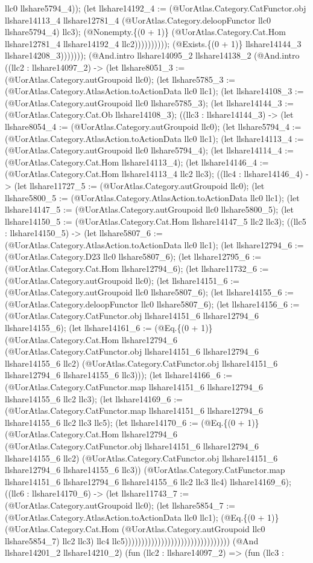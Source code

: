\documentclass[11pt]{article}
\begin{document}
llc0 llshare5794\_4)); (let llshare14192\_4 := (@UorAtlas.Category.CatFunctor.obj llshare14113\_4 llshare12781\_4 (@UorAtlas.Category.deloopFunctor llc0 llshare5794\_4) llc3); (@Nonempty.\{(0 + 1)\} (@UorAtlas.Category.Cat.Hom llshare12781\_4 llshare14192\_4 llc2)))))))))); (@Exists.\{(0 + 1)\} llshare14144\_3 llshare14208\_3))))))); (@And.intro llshare14095\_2 llshare14138\_2 (@And.intro ((llc2 : llshare14097\_2) -> (let llshare8051\_3 := (@UorAtlas.Category.autGroupoid llc0); (let llshare5785\_3 := (@UorAtlas.Category.AtlasAction.toActionData llc0 llc1); (let llshare14108\_3 := (@UorAtlas.Category.autGroupoid llc0 llshare5785\_3); (let llshare14144\_3 := (@UorAtlas.Category.Cat.Ob llshare14108\_3); ((llc3 : llshare14144\_3) -> (let llshare8054\_4 := (@UorAtlas.Category.autGroupoid llc0); (let llshare5794\_4 := (@UorAtlas.Category.AtlasAction.toActionData llc0 llc1); (let llshare14113\_4 := (@UorAtlas.Category.autGroupoid llc0 llshare5794\_4); (let llshare14114\_4 := (@UorAtlas.Category.Cat.Hom llshare14113\_4); (let llshare14146\_4 := (@UorAtlas.Category.Cat.Hom llshare14113\_4 llc2 llc3); ((llc4 : llshare14146\_4) -> (let llshare11727\_5 := (@UorAtlas.Category.autGroupoid llc0); (let llshare5800\_5 := (@UorAtlas.Category.AtlasAction.toActionData llc0 llc1); (let llshare14147\_5 := (@UorAtlas.Category.autGroupoid llc0 llshare5800\_5); (let llshare14150\_5 := (@UorAtlas.Category.Cat.Hom llshare14147\_5 llc2 llc3); ((llc5 : llshare14150\_5) -> (let llshare5807\_6 := (@UorAtlas.Category.AtlasAction.toActionData llc0 llc1); (let llshare12794\_6 := (@UorAtlas.Category.D23 llc0 llshare5807\_6); (let llshare12795\_6 := (@UorAtlas.Category.Cat.Hom llshare12794\_6); (let llshare11732\_6 := (@UorAtlas.Category.autGroupoid llc0); (let llshare14151\_6 := (@UorAtlas.Category.autGroupoid llc0 llshare5807\_6); (let llshare14155\_6 := (@UorAtlas.Category.deloopFunctor llc0 llshare5807\_6); (let llshare14156\_6 := (@UorAtlas.Category.CatFunctor.obj llshare14151\_6 llshare12794\_6 llshare14155\_6); (let llshare14161\_6 := (@Eq.\{(0 + 1)\} (@UorAtlas.Category.Cat.Hom llshare12794\_6 (@UorAtlas.Category.CatFunctor.obj llshare14151\_6 llshare12794\_6 llshare14155\_6 llc2) (@UorAtlas.Category.CatFunctor.obj llshare14151\_6 llshare12794\_6 llshare14155\_6 llc3))); (let llshare14166\_6 := (@UorAtlas.Category.CatFunctor.map llshare14151\_6 llshare12794\_6 llshare14155\_6 llc2 llc3); (let llshare14169\_6 := (@UorAtlas.Category.CatFunctor.map llshare14151\_6 llshare12794\_6 llshare14155\_6 llc2 llc3 llc5); (let llshare14170\_6 := (@Eq.\{(0 + 1)\} (@UorAtlas.Category.Cat.Hom llshare12794\_6 (@UorAtlas.Category.CatFunctor.obj llshare14151\_6 llshare12794\_6 llshare14155\_6 llc2) (@UorAtlas.Category.CatFunctor.obj llshare14151\_6 llshare12794\_6 llshare14155\_6 llc3)) (@UorAtlas.Category.CatFunctor.map llshare14151\_6 llshare12794\_6 llshare14155\_6 llc2 llc3 llc4) llshare14169\_6); ((llc6 : llshare14170\_6) -> (let llshare11743\_7 := (@UorAtlas.Category.autGroupoid llc0); (let llshare5854\_7 := (@UorAtlas.Category.AtlasAction.toActionData llc0 llc1); (@Eq.\{(0 + 1)\} (@UorAtlas.Category.Cat.Hom (@UorAtlas.Category.autGroupoid llc0 llshare5854\_7) llc2 llc3) llc4 llc5)))))))))))))))))))))))))))))))) (@And llshare14201\_2 llshare14210\_2) (fun (llc2 : llshare14097\_2) => (fun (llc3 : 
\end{document}
